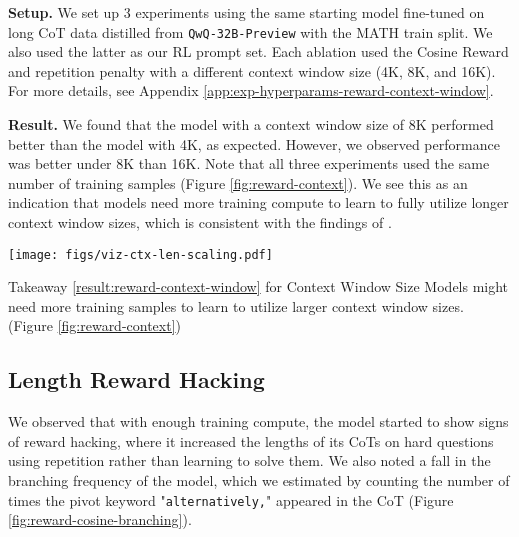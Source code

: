 \noindent\textbf{Setup.} We set up 3 experiments using the same starting model fine-tuned on long CoT data distilled from \texttt{QwQ-32B-Preview} with the MATH train split. We also used the latter as our RL prompt set. Each ablation used the Cosine Reward and repetition penalty with a different context window size (4K, 8K, and 16K). For more details, see Appendix \ref{app:exp-hyperparams-reward-context-window}.

\noindent\textbf{Result.} We found that the model with a context window size of 8K performed better than the model with 4K, as expected. However, we observed performance was better under 8K than 16K. Note that all three experiments used the same number of training samples (Figure \ref{fig:reward-context}). We see this as an indication that models need more training compute to learn to fully utilize longer context window sizes, which is consistent with the findings of \cite{hou2025advancinglanguagemodelreasoning}.

\begin{figure*}
    \centering
    \texttt{[image: figs/viz-ctx-len-scaling.pdf]}
    \vspace{-20pt}
    \caption{Performance of \texttt{Llama-3.1-8B} trained with different context window sizes. All experiments used the same number of training samples.}
    \vspace{-10pt}
    \label{fig:reward-context}
\end{figure*}

\begin{AIbox}{Takeaway \hypersetup{hidelinks}\ref{result:reward-context-window} for Context Window Size}
Models might need more training samples to learn to utilize larger context window sizes. (Figure \ref{fig:reward-context})
\end{AIbox}

\subsection{Length Reward Hacking}
\label{result:reward-hacking}

We observed that with enough training compute, the model started to show signs of reward hacking, where it increased the lengths of its CoTs on hard questions using repetition rather than learning to solve them. We also noted a fall in the branching frequency of the model, which we estimated by counting the number of times the pivot keyword "\texttt{alternatively,}" appeared in the CoT (Figure \ref{fig:reward-cosine-branching}).

